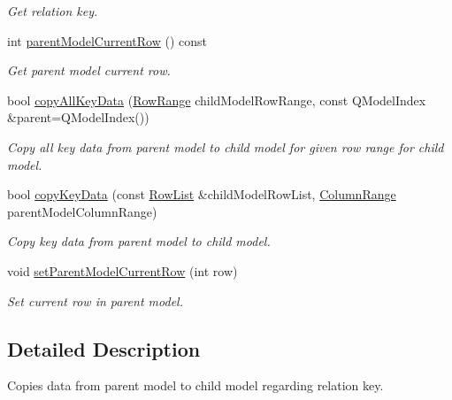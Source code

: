 \begin{DoxyCompactItemize}
\begin{DoxyCompactList}\small\item\em Get relation key. \end{DoxyCompactList}\item 
int \hyperlink{class_mdt_1_1_item_model_1_1_relation_key_copier_a9d9e3c714503dac4925b3ae04cc1bf41}{parent\+Model\+Current\+Row} () const \hypertarget{class_mdt_1_1_item_model_1_1_relation_key_copier_a9d9e3c714503dac4925b3ae04cc1bf41}{}\label{class_mdt_1_1_item_model_1_1_relation_key_copier_a9d9e3c714503dac4925b3ae04cc1bf41}

\begin{DoxyCompactList}\small\item\em Get parent model current row. \end{DoxyCompactList}\item 
bool \hyperlink{class_mdt_1_1_item_model_1_1_relation_key_copier_a828cf1760009af95346e81860318a97d}{copy\+All\+Key\+Data} (\hyperlink{class_mdt_1_1_item_model_1_1_row_range}{Row\+Range} child\+Model\+Row\+Range, const Q\+Model\+Index \&parent=Q\+Model\+Index())
\begin{DoxyCompactList}\small\item\em Copy all key data from parent model to child model for given row range for child model. \end{DoxyCompactList}\item 
bool \hyperlink{class_mdt_1_1_item_model_1_1_relation_key_copier_afaf09fb0922dba087784d64a172dd61d}{copy\+Key\+Data} (const \hyperlink{class_mdt_1_1_item_model_1_1_row_list}{Row\+List} \&child\+Model\+Row\+List, \hyperlink{class_mdt_1_1_item_model_1_1_column_range}{Column\+Range} parent\+Model\+Column\+Range)
\begin{DoxyCompactList}\small\item\em Copy key data from parent model to child model. \end{DoxyCompactList}\item 
void \hyperlink{class_mdt_1_1_item_model_1_1_relation_key_copier_a99a08a7cdb363bf62ff28b2f7fd8403e}{set\+Parent\+Model\+Current\+Row} (int row)
\begin{DoxyCompactList}\small\item\em Set current row in parent model. \end{DoxyCompactList}\end{DoxyCompactItemize}


\subsection{Detailed Description}
Copies data from parent model to child model regarding relation key. 


